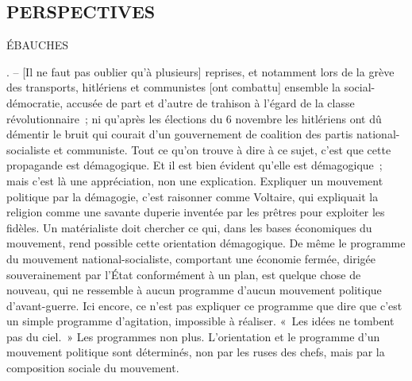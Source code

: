 \documentclass[french,twoside]{book} %
\begin{document}
\subsection[{PERSPECTIVES}]{PERSPECTIVES}

\begin{center}
\noindent \centerline{ÉBAUCHES}\par
\end{center}

. – [Il ne faut pas oublier qu'à plusieurs] reprises, et notamment lors de la grève des transports, hitlériens et communistes [ont combattu] ensemble la social-démocratie, accusée de part et d'autre de trahison à l'égard de la classe révolutionnaire ; ni qu'après les élections du 6 novembre les hitlériens ont dû démentir le bruit qui courait d'un gouvernement de coalition des partis national-socialiste et communiste. Tout ce qu'on trouve à dire à ce sujet, c'est que cette propagande est démagogique. Et il est bien évident qu'elle est démagogique ; mais c'est là une appréciation, non une explication. Expliquer un mouvement politique par la démagogie, c'est raisonner comme Voltaire, qui expliquait la religion comme une savante duperie inventée par les prêtres pour exploiter les fidèles. Un matérialiste doit chercher ce qui, dans les bases économiques du mouvement, rend possible cette orientation démagogique. De même le programme du mouvement national-socialiste, comportant une économie fermée, dirigée souverainement par l'État conformément à un plan, est quelque chose de nouveau, qui ne ressemble à aucun programme d'aucun mouvement politique d'avant-guerre. Ici encore, ce n'est pas expliquer ce programme que dire que c'est un simple programme d'agitation, impossible à réaliser. « Les idées ne tombent pas du ciel. » Les programmes non plus. L'orientation et le programme d'un mouvement politique sont déterminés, non par les ruses des chefs, mais par la composition sociale du mouvement.\par
\end{document}
